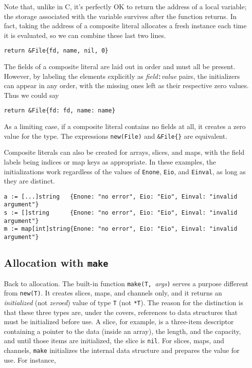Note that, unlike in C, it's perfectly OK to return the address of a
local variable; the storage associated with the variable survives after
the function returns. In fact, taking the address of a composite literal
allocates a fresh instance each time it is evaluated, so we can combine
these last two lines.

\begin{Verbatim}[frame=single]
    return &File{fd, name, nil, 0}
\end{Verbatim}

The fields of a composite literal are laid out in order and must all be
present. However, by labeling the elements explicitly as
\emph{field}\texttt{:}\emph{value} pairs, the initializers can appear in
any order, with the missing ones left as their respective zero values.
Thus we could say

\begin{Verbatim}[frame=single]
    return &File{fd: fd, name: name}
\end{Verbatim}

As a limiting case, if a composite literal contains no fields at all, it
creates a zero value for the type. The expressions \texttt{new(File)}
and \texttt{\&File\{\}} are equivalent.

Composite literals can also be created for arrays, slices, and maps,
with the field labels being indices or map keys as appropriate. In these
examples, the initializations work regardless of the values of
\texttt{Enone}, \texttt{Eio}, and \texttt{Einval}, as long as they are
distinct.

\begin{Verbatim}[frame=single]
a := [...]string   {Enone: "no error", Eio: "Eio", Einval: "invalid argument"}
s := []string      {Enone: "no error", Eio: "Eio", Einval: "invalid argument"}
m := map[int]string{Enone: "no error", Eio: "Eio", Einval: "invalid argument"}
\end{Verbatim}

\subsection*{Allocation with \texttt{make}}

Back to allocation. The built-in function
\texttt{make(T, }\emph{args}\texttt{)} serves a purpose different from
\texttt{new(T)}. It creates slices, maps, and channels only, and it
returns an \emph{initialized} (not \emph{zeroed}) value of type
\texttt{T} (not \texttt{*T}). The reason for the distinction is that
these three types are, under the covers, references to data structures
that must be initialized before use. A slice, for example, is a
three-item descriptor containing a pointer to the data (inside an
array), the length, and the capacity, and until those items are
initialized, the slice is \texttt{nil}. For slices, maps, and channels,
\texttt{make} initializes the internal data structure and prepares the
value for use. For instance,

